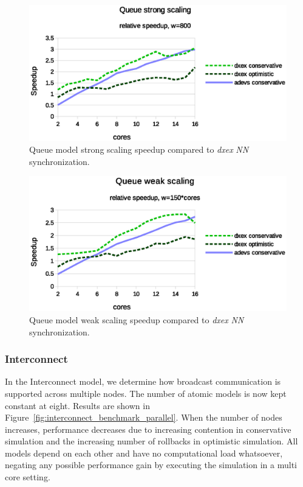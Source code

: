 \begin{figure}
	\center
	\includegraphics[width=\columnwidth]{fig/queue_fixed_strong_speedup.eps}
	\caption{Queue model strong scaling speedup compared to \textit{dxex} \textit{NN} synchronization.}
	\label{fig:Queue_plot_strong}
\end{figure}

\begin{figure}
	\center
	\includegraphics[width=\columnwidth]{fig/queue_fixed_weak_speedup.eps}
	\caption{Queue model weak scaling speedup compared to \textit{dxex} \textit{NN} synchronization.}
	\label{fig:Queue_plot_weak}
\end{figure}
	
\subsubsection{Interconnect}
\label{subsec:parallelinterconnect}
In the Interconnect model, we determine how broadcast communication is supported across multiple nodes.
The number of atomic models is now kept constant at eight.
Results are shown in Figure~\ref{fig:interconnect_benchmark_parallel}.
When the number of nodes increases, performance decreases due to increasing contention in conservative simulation and the increasing number of rollbacks in optimistic simulation.
All models depend on each other and have no computational load whatsoever, negating any possible performance gain by executing the simulation in a multi core setting.


